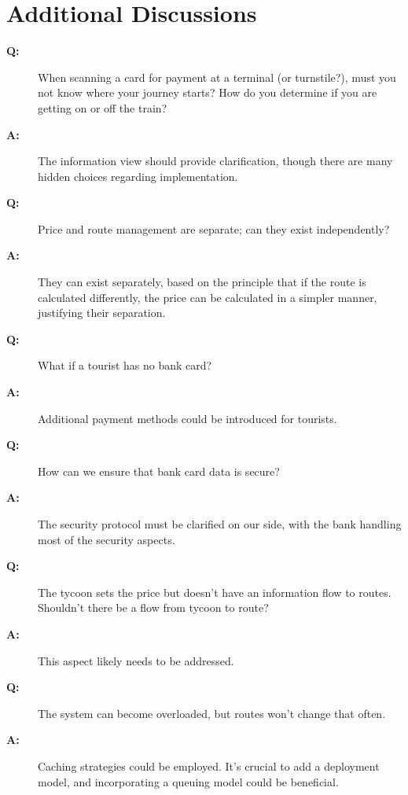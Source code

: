 \documentclass{article}
\begin{document}
\section{Additional Discussions}
\begin{description}
  \item[\textbf{Q:}] When scanning a card for payment at a terminal (or turnstile?), must you not know where your journey starts? How do you determine if you are getting on or off the train?
  \item[\textbf{A:}] The information view should provide clarification, though there are many hidden choices regarding implementation.
  
  \item[\textbf{Q:}] Price and route management are separate; can they exist independently?
  \item[\textbf{A:}] They can exist separately, based on the principle that if the route is calculated differently, the price can be calculated in a simpler manner, justifying their separation.
  
  \item[\textbf{Q:}] What if a tourist has no bank card?
  \item[\textbf{A:}] Additional payment methods could be introduced for tourists.
  
  \item[\textbf{Q:}] How can we ensure that bank card data is secure?
  \item[\textbf{A:}] The security protocol must be clarified on our side, with the bank handling most of the security aspects.
  
  \item[\textbf{Q:}] The tycoon sets the price but doesn't have an information flow to routes. Shouldn't there be a flow from tycoon to route?
  \item[\textbf{A:}] This aspect likely needs to be addressed.
  
  \item[\textbf{Q:}] The system can become overloaded, but routes won't change that often.
  \item[\textbf{A:}] Caching strategies could be employed. It's crucial to add a deployment model, and incorporating a queuing model could be beneficial.
\end{description}
\end{document}
